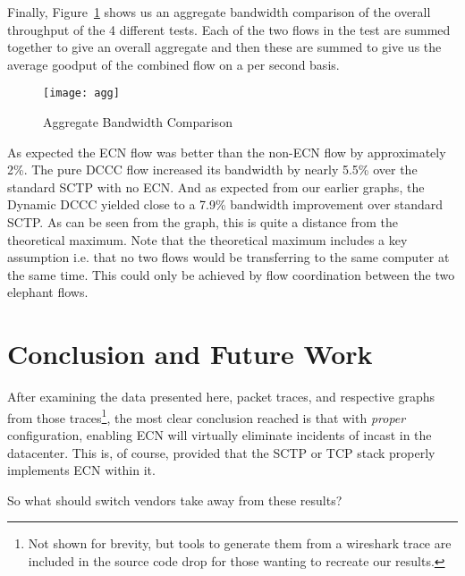 \documentclass[12pt]{article}
\begin{document}
Finally, Figure~\ref{fig:aggBw}  shows us an aggregate bandwidth comparison of the 
overall throughput of the 4 different tests. Each of the two flows in the test are summed
together to give an overall aggregate and then these are summed to give us the average
goodput of the combined flow on a per second basis. 

\begin{figure}[!h]
\centering
\texttt{[image: agg]}
\caption{Aggregate Bandwidth Comparison}
\label{fig:aggBw}
\end{figure}

As expected the ECN flow was better than the non-ECN flow by approximately 2\%. The
pure DCCC flow increased its bandwidth by nearly 5.5\% over the standard SCTP with no ECN.
And as expected from our earlier graphs, the Dynamic DCCC yielded close to a 7.9\% bandwidth
improvement over standard SCTP. As can be seen from the graph, this is quite a distance from the
theoretical maximum. Note that the theoretical maximum includes a key assumption i.e. that 
no two flows would be transferring to the same computer at the same time. This could only
be achieved by flow coordination between the two elephant flows.

\section{Conclusion and Future Work}

After examining the data presented here, packet traces, and respective
graphs from those traces\footnote{Not shown for brevity, but tools to generate them from a wireshark trace are included in the source
code drop for those wanting to recreate our results.}, the most clear conclusion reached is that 
with \emph{proper} configuration, enabling ECN will virtually eliminate incidents of
incast in the datacenter. This is, of course, provided that the SCTP or
TCP stack properly implements ECN within it. 

So what should switch vendors take away from these results?
\end{document}
